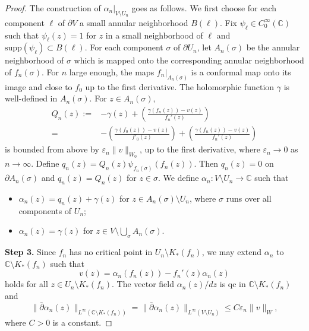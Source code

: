 \documentclass{amsart}
\numberwithin{equation}{section}
\newcommand{\C}{\mathbb C}
\theoremstyle{definition}
\theoremstyle{remark}
\begin{document}
\begin{proof}
The construction of $\alpha_n|_{V\setminus U_n}$ goes as follows. We  first choose for each component $\ell$ of $\partial V$ a small annular  neighborhood $B(\ell)$. Fix $\psi_\ell\in C_0^\infty(\C)$ such that $\psi_\ell(z)=1$ for $z$ in a small neighborhood of $\ell$ and $\text{supp} (\psi_\ell)\subset B(\ell)$. 
For each component $\sigma$ of $\partial U_n$, let $A_n(\sigma)$ be the annular neighborhood of $\sigma$ which is mapped onto the corresponding annular neighborhood of $f_n(\sigma)$. For $n$ large enough, the maps $f_n|_{A_n(\sigma)}$ is a conformal map onto its image and close to $f_0$ up to the first derivative. The holomorphic function $\gamma$ is well-defined in $A_n(\sigma)$. For $z\in A_n(\sigma)$, 
\begin{align*}
Q_n(z):=& -\gamma(z)+\left(\frac{\gamma(f_n(z))-v(z)}{f_n'(z)}\right)\\
=& -\left(\frac{\gamma(f_0(z))-v(z)}{f'_0(z)}\right)+
\left(\frac{\gamma(f_n(z))-v(z)}{f_n'(z)}\right)
\end{align*}
is bounded from above by $\varepsilon_n \|v\|_{W_0}$, up to the first derivative, where $\varepsilon_n\to 0$ as $n\to\infty$. Define $q_n(z)=Q_n(z)\psi_{f_n(\sigma)} (f_n(z))$. Then $q_n(z)=0$ on $\partial A_n(\sigma)$ and $q_n(z)=Q_n(z)$ for $z\in \sigma$. We define $\alpha_n:V\setminus U_n\to \mathbb{C}$ such that
\begin{itemize}
\item $\alpha_n(z)=q_n(z)+\gamma(z)$ for $z\in A_n(\sigma)\setminus U_n$, where $\sigma$ runs over all components of $U_n$; 
\item $\alpha_n(z)=\gamma(z)$ for $z\in V\setminus\bigcup_{\sigma} A_n(\sigma)$. 
\end{itemize}




{\bf Step 3.} Since $f_n$ has no critical point in $U_n\setminus K_*(f_n)$, we may extend $\alpha_n$ to $\C\setminus K_*(f_n)$ such that 
$$v(z)=\alpha_n(f_n(z))-f_n'(z) \alpha_n(z)$$
holds for all $z\in U_n\setminus K_*(f_n)$.
The vector field $\alpha_n(z)/dz$ is qc in $\C\setminus K_*(f_n)$ and 
\begin{equation}\label{eqn:estalphan}
\|\bar{\partial}\alpha_n(z)\|_{L^\infty (\C\setminus K_*(f_n))}=\|\bar{\partial} \alpha_n(z)\|_{L^\infty (V\setminus U_n)}\le C\varepsilon_n \|v\|_{W},
\end{equation}
where $C>0$ is a constant.



\end{proof}
\end{document}
